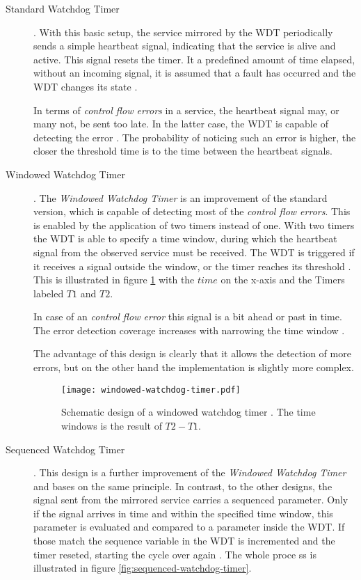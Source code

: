 \begin{description}
\item [Standard Watchdog Timer] .
With this basic setup, the service mirrored by the WDT periodically sends a simple heartbeat signal, indicating that the service is alive and active. This signal resets the timer. It a predefined amount of time elapsed, without an incoming signal, it is assumed that a fault has occurred and the WDT changes its state \cite{elattar2007}.

In terms of \emph{control flow errors} in a service, the heartbeat signal may, or many not, be sent too late. In the latter case, the WDT is capable of detecting the error \cite{elattar2007}. 
The probability of noticing such an error is higher, the closer the threshold time is to the time between the heartbeat signals.

\item [Windowed Watchdog Timer] .
The \emph{Windowed Watchdog Timer} is an improvement of the standard version, which is capable of detecting most of the \emph{control flow errors}. This is enabled by the application of two timers instead of one. With two timers the WDT is able to specify a time window, during which the heartbeat signal from the observed service must be received. The WDT is triggered if it receives a signal outside the window, or the timer reaches its threshold \cite{elattar2007}. This is illustrated in figure \ref{fig:windowed-watchdog-timer} with the $time$ on the x-axis and the Timers labeled $T1$ and $T2$.

In case of an \emph{control flow error} this signal is a bit ahead or past in time. The error detection coverage increases with narrowing the time window \cite{elattar2007}.  

The advantage of this design is clearly that it allows the detection of more errors, but on the other hand the implementation is slightly more complex.

\begin{figure}[!htbp]
\centering
\texttt{[image: windowed-watchdog-timer.pdf]}
\caption{Schematic design of a windowed watchdog timer \cite{elattar2007}. The time windows is the result of $T2 - T1$.}
\label{fig:windowed-watchdog-timer}
\end{figure}

\item [Sequenced Watchdog Timer] . 
This design is a further improvement of the \emph{Windowed Watchdog Timer} and bases on the same principle. In contrast, to the other designs, the signal sent from the mirrored service carries a sequenced parameter. Only if the signal arrives in time and within the specified time window, this parameter is evaluated and compared to a parameter inside the WDT. If those match the sequence variable in the WDT is incremented and the timer reseted, starting the cycle over again \cite{elattar2007}.
The whole proce ss is illustrated in figure \ref{fig:sequenced-watchdog-timer}.


\end{description}
